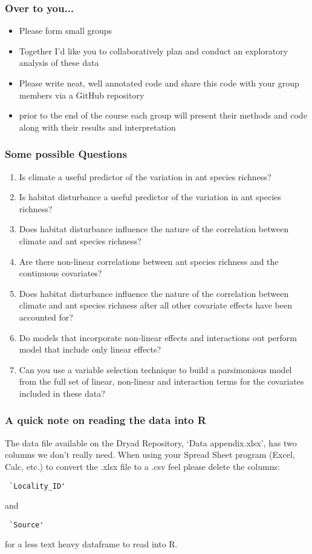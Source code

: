 \documentclass[xcolor=dvipsnames]{beamer}
\begin{document}
\begin{frame} 
\frametitle{Over to you...}
\begin{itemize}
\item Please form small groups
\newline
\item Together I'd like you to collaboratively plan and conduct an exploratory analysis of these data
\newline
\item Please write neat, well annotated code and share this code with your group members via a GitHub repository
\newline
\item prior to the end of the course each group will present their methods and code along with their results and interpretation 
\end{itemize}
\end{frame}


\begin{frame}
\frametitle{Some possible Questions}
\begin{enumerate}
\item Is climate a useful predictor of the variation in ant species richness?
\item Is habitat disturbance a useful predictor of the variation in ant species richness?
\item Does habitat disturbance influence the nature of the correlation between climate and ant species richness?
\item Are there non-linear correlations between ant species richness and the continuous covariates?
\item Does habitat disturbance influence the nature of the correlation between climate and ant species richness after all other covariate effects have been accounted for?
\item Do models that incorporate non-linear effects and interactions out perform model that include only linear effects?
\item Can you use a variable selection technique to build a parsimonious model from the full set of linear, non-linear and interaction terms for the covariates included in these data?
\end{enumerate}
\end{frame}

\begin{frame}[fragile]
\frametitle{A quick note on reading the data into R}
The data file available on the Dryad Repository, `Data appendix.xlsx', has two columns we don't really need.\newline
\newline
When using your Spread Sheet program (Excel, Calc, etc.) to convert the .xlsx file to a .csv feel please delete the columns:
\begin{verbatim} `Locality_ID' \end{verbatim} and
\begin{verbatim} `Source'      \end{verbatim}
 for a less text heavy dataframe to read into R.
\end{frame}
\end{document}
